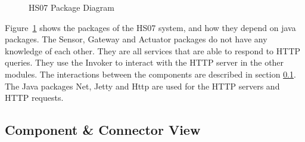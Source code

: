 \documentclass[a4paper,10pt]{article}
\begin{document}
\begin{figure}[!htb]
\caption{HS07 Package Diagram}
\label{fig:mv}
\end{figure}

Figure~\ref{fig:mv} shows the packages of the HS07 system, and how they depend
on java packages. The Sensor, Gateway and Actuator packages do not have
any knowledge of each other. They are all services that are able to respond to
HTTP queries. They use the Invoker to interact with the HTTP server in the
other modules. The interactions between the components are described in section
\ref{sec:component}. The Java packages Net, Jetty and Http are used for the
HTTP servers and HTTP requests.

\subsection{Component \& Connector View}
\label{sec:component}
\end{document}
